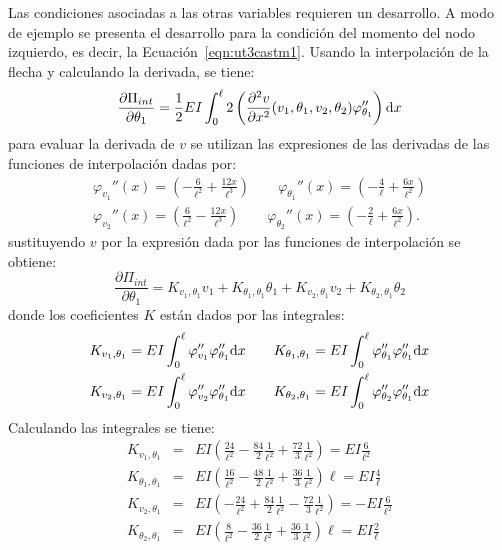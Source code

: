 Las condiciones asociadas a las otras variables requieren un desarrollo. %
%
A modo de ejemplo se presenta el desarrollo para la condición del momento del nodo izquierdo, es decir, la Ecuación~\eqref{eqn:ut3castm1}. %
%
Usando la interpolación de la flecha y calculando la derivada, se tiene:
%
\begin{equation}
	\frac{\partial \Pi_{int}}{\partial \theta_1} = \frac{1}{2} EI \int_0^{\ell} 2 \left( \frac{\partial^2 v}{\partial x^2} (v_1,\theta_1,v_2,\theta_2) \varphi_{\theta_1}'' \right) {\text{d}} x
\end{equation}
%
para evaluar la derivada de $v$ se utilizan las expresiones de las derivadas de las funciones de interpolación dadas por:
%
\begin{eqnarray}
	\varphi_{v_1}'' (x) = \left(- \frac{6}{\ell^{2}} + \frac{12 x}{\ell^{3}}\right) \qquad %
	\varphi_{\theta_1}'' (x) =	\left( - \frac{4}{\ell} + \frac{6 x }{\ell^{2}}\right) \\
	\varphi_{v_2}'' (x) =	\left(\frac{6}{\ell^{2}} - \frac{12 x}{\ell^{3}}\right) \qquad %
	\varphi_{\theta_2}'' (x) = \left(- \frac{2}{\ell} + \frac{6 x}{\ell^{2}}\right) .
\end{eqnarray}
%
sustituyendo $v$ por la expresión dada por las funciones de interpolación se obtiene:
%
\begin{equation}
	\frac{\partial \Pi_{int}}{\partial \theta_1} = K_{v_1,\theta_1} v_1 + K_{\theta_1,\theta_1} \theta_1 + K_{v_2,\theta_1} v_2  + K_{\theta_2,\theta_1} \theta_2
\end{equation}
%
donde los coeficientes $K$ están dados por las integrales:
%
\begin{eqnarray}
	K_{v_1,\theta_1} = EI \int_0^\ell \varphi_{v_1}'' \varphi_{\theta_1}'' {\text{d}} x \qquad
	K_{\theta_1,\theta_1} = EI \int_0^\ell \varphi_{\theta_1}'' \varphi_{\theta_1}'' {\text{d}} x \\
	K_{v_2,\theta_1} = EI \int_0^\ell \varphi_{v_2}'' \varphi_{\theta_1}'' {\text{d}} x \qquad 
	K_{\theta_2,\theta_1} = EI\int_0^\ell \varphi_{\theta_2}'' \varphi_{\theta_1}'' {\text{d}} x 
\end{eqnarray}
%
Calculando las integrales se tiene:
%
\begin{eqnarray}
	K_{v_1,\theta_1} &=& EI \left(   \frac{24}{\ell^2} -  \frac{84}{2} \frac{1}{\ell^2} + \frac{72}{3} \frac{1}{\ell^2} \right) = EI \frac{6}{\ell^2} \\
	K_{\theta_1,\theta_1} &=& EI \left(   \frac{16}{\ell^2} -  \frac{48}{2}\frac{1}{\ell^2} +\frac{36}{3} \frac{1}{\ell^2}  \right) \ell = EI \frac{4}{\ell}\\
	K_{v_2,\theta_1} &=& EI \left(  - \frac{24}{\ell^2} + \frac{84}{2} \frac{1}{\ell^2} - \frac{72}{3} \frac{1}{\ell^2} \right) = -EI \frac{6}{\ell^2} \\
	K_{\theta_2,\theta_1} &=& EI \left(   \frac{8}{\ell^2} -  \frac{36}{2} \frac{1}{\ell^2} + \frac{36}{3} \frac{1}{\ell^2}  \right)\ell = EI \frac{2}{\ell}
\end{eqnarray}

